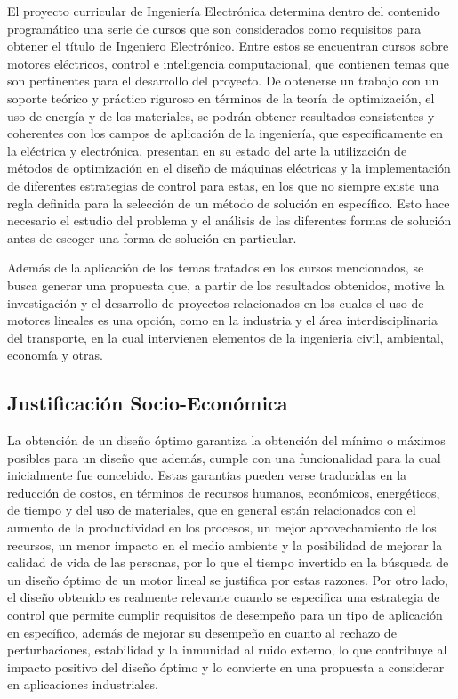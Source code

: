 El proyecto curricular de Ingeniería Electrónica determina dentro del contenido programático una serie de cursos que son considerados como requisitos para obtener el título de Ingeniero Electrónico. Entre estos se encuentran cursos sobre motores eléctricos, control e inteligencia computacional, que contienen temas que son pertinentes para el desarrollo del proyecto. De obtenerse un trabajo con un soporte teórico y práctico riguroso en términos de la teoría de optimización, el uso de energía y de los materiales, se podrán obtener resultados consistentes y coherentes con los campos de aplicación de la ingeniería, que específicamente en la eléctrica y electrónica, presentan en su estado del arte la utilización de métodos de optimización en el diseño de máquinas eléctricas y la implementación de diferentes estrategias de control para estas, en los que no siempre existe una regla definida para la selección de un método de solución en específico. Esto hace necesario el estudio del problema y el análisis de las diferentes formas de solución antes de escoger una forma de solución en particular.

Además de la aplicación de los temas tratados en los cursos mencionados, se busca generar una propuesta que, a partir de los resultados obtenidos, motive la investigación y el desarrollo de proyectos relacionados en los cuales el uso de motores lineales es una opción, como en la industria y el área interdisciplinaria del transporte, en la cual intervienen elementos de la ingenieria civil, ambiental, economía y otras.

\subsection{Justificación Socio-Económica}

La obtención de un diseño óptimo garantiza la obtención del mínimo o máximos posibles para un diseño que además, cumple con una funcionalidad para la cual inicialmente fue concebido. Estas garantías pueden verse traducidas en la reducción de costos, en términos de recursos humanos, económicos, energéticos, de tiempo y del uso de materiales, que en general están relacionados con el aumento de la productividad en los procesos, un mejor aprovechamiento de los recursos, un menor impacto en el medio ambiente y la posibilidad de mejorar la calidad de vida de las personas, por lo que el tiempo invertido en la búsqueda de un diseño óptimo de un motor lineal se justifica por estas razones. Por otro lado, el diseño obtenido es realmente relevante cuando se especifica una estrategia de control que permite cumplir requisitos de desempeño para un tipo de aplicación en específico, además de mejorar su desempeño en cuanto al rechazo de perturbaciones, estabilidad y  la inmunidad al ruido externo, lo que contribuye al impacto positivo del diseño óptimo y lo convierte en una propuesta a considerar en aplicaciones industriales.

